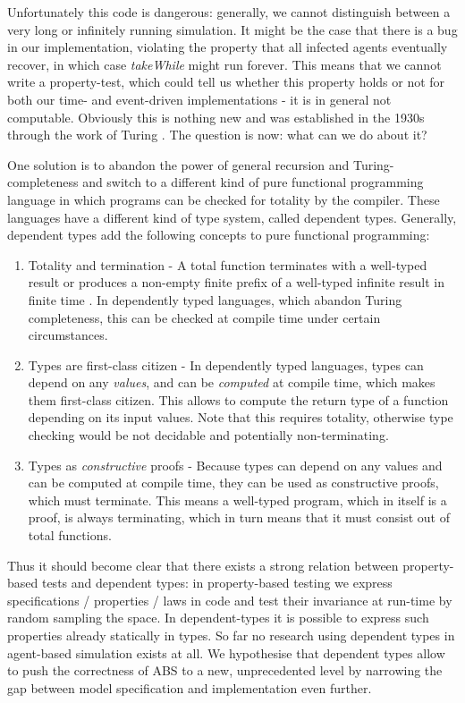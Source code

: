 Unfortunately this code is dangerous: generally, we cannot distinguish between a very long or infinitely running simulation. It might be the case that there is a bug in our implementation, violating the property that all infected agents eventually recover, in which case \textit{takeWhile} might run forever. This means that we cannot write a property-test, which could tell us whether this property holds or not for both our time- and event-driven implementations - it is in general not computable. Obviously this is nothing new and was established in the 1930s through the work of Turing \cite{turing_computable_1937}. The question is now: what can we do about it?

One solution is to abandon the power of general recursion and Turing-completeness and switch to a different kind of pure functional programming language in which programs can be checked for totality by the compiler. These languages have a different kind of type system, called dependent types. Generally, dependent types add the following concepts to pure functional programming:

\begin{enumerate}
	\item Totality and termination - A total function terminates with a well-typed result or produces a non-empty finite prefix of a well-typed infinite result in finite time \cite{brady_type-driven_2017}. In dependently typed languages, which abandon Turing completeness, this can be checked at compile time under certain circumstances.
	
	\item Types are first-class citizen - In dependently typed languages, types can depend on any \textit{values}, and can be \textit{computed} at compile time, which makes them first-class citizen. This allows to compute the return type of a function depending on its input values. Note that this requires totality, otherwise type checking would be not decidable and potentially non-terminating.
	
	\item Types as \textit{constructive} proofs - Because types can depend on any values and can be computed at compile time, they can be used as constructive proofs, which must terminate. This means a well-typed program, which in itself is a proof, is always terminating, which in turn means that it must consist out of total functions.
\end{enumerate}

Thus it should become clear that there exists a strong relation between property-based tests and dependent types: in property-based testing we express specifications / properties / laws in code and test their invariance at run-time by random sampling the space. In dependent-types it is possible to express such properties already statically in types. So far no research using dependent types in agent-based simulation exists at all. We hypothesise that dependent types allow to push the correctness of ABS to a new, unprecedented level by narrowing the gap between model specification and implementation even further.

